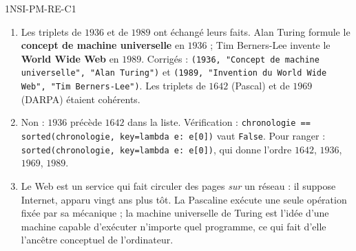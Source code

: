 \begin{corrige}{1NSI-PM-RE-C1}
\begin{enumerate}
  \item Les triplets de $1936$ et de $1989$ ont échangé leurs faits. Alan Turing formule le
        \textbf{concept de machine universelle} en $1936$ ; Tim Berners-Lee invente le
        \textbf{World Wide Web} en $1989$. Corrigés :
        \lstinline{(1936, "Concept de machine universelle", "Alan Turing")} et
        \lstinline{(1989, "Invention du World Wide Web", "Tim Berners-Lee")}. Les triplets de
        $1642$ (Pascal) et de $1969$ (DARPA) étaient cohérents.
  \item Non : $1936$ précède $1642$ dans la liste. Vérification :
        \lstinline{chronologie == sorted(chronologie, key=lambda e: e[0])} vaut
        \lstinline{False}. Pour ranger : \lstinline{sorted(chronologie, key=lambda e: e[0])},
        qui donne l'ordre $1642$, $1936$, $1969$, $1989$.
  \item Le Web est un service qui fait circuler des pages \emph{sur} un réseau : il suppose
        Internet, apparu vingt ans plus tôt. La Pascaline exécute une seule opération fixée
        par sa mécanique ; la machine universelle de Turing est l'idée d'une machine capable
        d'exécuter n'importe quel programme, ce qui fait d'elle l'ancêtre conceptuel de
        l'ordinateur.
\end{enumerate}
\end{corrige}
